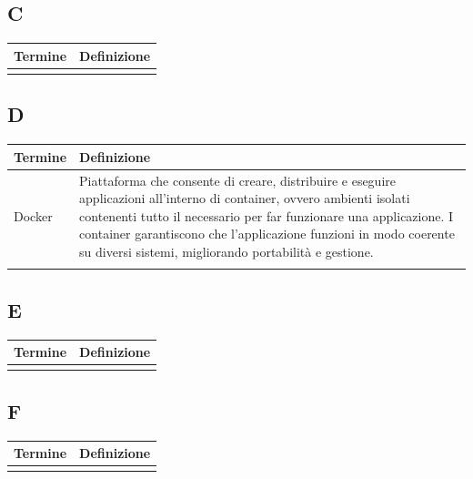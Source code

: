\documentclass[10pt]{article}
\begin{document}
\subsection{C} %
\begin{tabularx}{\textwidth}{|>{\centering\arraybackslash}l|X|}
\hline
\rowcolor[gray]{0.8}
\textbf{Termine} & \textbf{Definizione}\\
\hline
 & \\
\hline
\end{tabularx}

\subsection{D} %
\begin{tabularx}{\textwidth}{|>{\centering\arraybackslash}l|X|}
\hline
\rowcolor[gray]{0.8}
\textbf{Termine} & \textbf{Definizione}\\
\hline
Docker & Piattaforma che consente di creare, distribuire e eseguire applicazioni all'interno di container, ovvero ambienti isolati contenenti tutto il necessario per far funzionare una applicazione. I container garantiscono che l'applicazione funzioni in modo coerente su diversi sistemi, migliorando portabilità e gestione.\\
\hline
 & \\
\hline
\end{tabularx}

\subsection{E} %
\begin{tabularx}{\textwidth}{|>{\centering\arraybackslash}l|X|}
\hline
\rowcolor[gray]{0.8}
\textbf{Termine} & \textbf{Definizione}\\
\hline
 & \\
\hline
\end{tabularx}

\subsection{F} %
\begin{tabularx}{\textwidth}{|>{\centering\arraybackslash}l|X|}
\hline
\rowcolor[gray]{0.8}
\textbf{Termine} & \textbf{Definizione}\\
\hline
 & \\
\hline
\end{tabularx}
\end{document}
